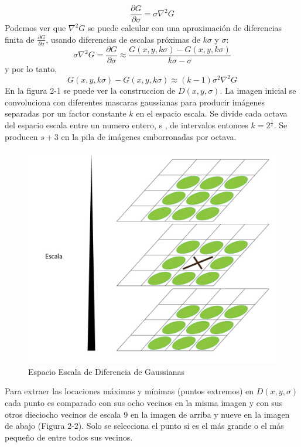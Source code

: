		$$\frac{\partial G}{\partial \sigma} = \sigma \nabla^2 G$$
		Podemos ver que $\nabla^2 G$ se puede calcular con una aproximación de diferencias finita de  $\frac{\partial G}{\partial \sigma}$, usando diferencias de escalas próximas de $k\sigma$ y $\sigma$:
		$$ \sigma \nabla^2 G = \frac{ \partial G}{\partial \sigma} \approx  \frac{G(x , y , k \sigma) - G( x , y, k \sigma)}{k \sigma - \sigma}$$
		y por lo tanto,
		$$ G(x , y , k \sigma) - G( x , y, k \sigma) \approx (k - 1)\sigma^2 \nabla^2 G $$
		En la figura 2-1 se puede ver la construccion de $D(x,y,\sigma)$. La imagen inicial se convoluciona con diferentes mascaras gaussianas para producir imágenes separadas por un factor constante $k$ en el espacio escala. Se divide cada octava del espacio escala entre un numero entero, s , de intervalos entonces $k= 2^\frac{1}{s}$. Se producen $s+3$ en la pila de imágenes emborronadas por octava.
		\begin{figure}[h]
			\centering
				\includegraphics[scale=0.3]{img/EscalaPuntosExtremos.jpg}
			\caption{Espacio Escala de Diferencia de Gaussianas}
		\end{figure}
		Para extraer las locaciones máximas y mínimas (puntos extremos) en $D(x,y,\sigma)$cada punto es comparado con sus ocho vecinos en la misma imagen y con sus otros dieciocho vecinos de escala 9 en la imagen de arriba y nueve en la imagen de abajo (Figura 2-2). Solo se selecciona el punto si es el más grande o el más pequeño de entre todos sus vecinos.
	

